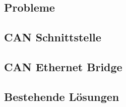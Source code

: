 \subsection{Probleme}
	
\subsection{CAN Schnittstelle}
	
\subsection{CAN Ethernet Bridge}
	
\subsection{Bestehende Lösungen}



\newpage {} \listoffigures

\newpage {}
% 


